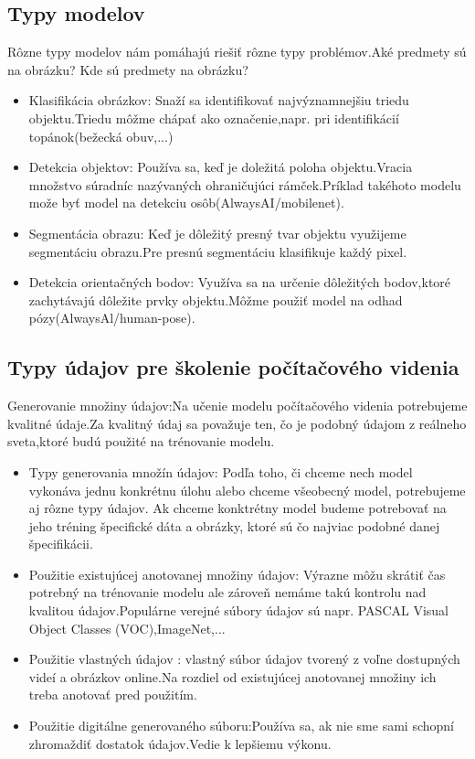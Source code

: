 \documentclass[10pt,twoside,slovak,a4paper]{coursepaper}
\begin{document}
\subsection{Typy modelov} \label{ina:nejako}
Rôzne typy modelov nám pomáhajú riešiť rôzne typy problémov.Aké predmety sú na obrázku? Kde sú predmety na obrázku?
\begin{itemize}
\item Klasifikácia obrázkov: Snaží sa identifikovať najvýznamnejšiu triedu objektu.Triedu môžme chápať ako označenie,napr. pri identifikácií topánok(bežecká obuv,...)

\item Detekcia objektov: Používa sa, keď je doležitá poloha objektu.Vracia množstvo súradníc nazývaných ohraničujúci rámček.Príklad takéhoto modelu može byť model na detekciu osôb(AlwaysAI/mobilenet).

\item Segmentácia obrazu: Keď je dôležitý presný tvar objektu využijeme segmentáciu obrazu.Pre presnú segmentáciu klasifikuje každý pixel.

\item Detekcia orientačných bodov: Využíva sa na určenie dôležitých bodov,ktoré zachytávajú dôležite prvky objektu.Môžme použiť model na odhad pózy(AlwaysAl/human-pose).
\cite{CV-Framework}
\end{itemize}

\subsection{Typy údajov pre školenie počítačového videnia}
Generovanie množiny údajov:Na učenie modelu počítačového videnia potrebujeme kvalitné údaje.Za kvalitný údaj sa považuje ten, čo je podobný údajom z reálneho sveta,ktoré budú použité na trénovanie modelu.

\begin{itemize}
\item Typy generovania množín údajov: Podľa toho, či chceme nech model vykonáva jednu konkrétnu úlohu alebo chceme všeobecný model, potrebujeme aj rôzne typy údajov.
Ak chceme konktrétny model budeme potrebovať na jeho tréning špecifické dáta a obrázky, ktoré sú čo najviac podobné danej špecifikácii.
\item Použitie existujúcej anotovanej množiny údajov: Výrazne môžu skrátiť čas potrebný na trénovanie modelu ale zároveň nemáme takú kontrolu nad kvalitou údajov.Populárne verejné súbory údajov sú napr. PASCAL Visual Object Classes (VOC),ImageNet,...
\item Použitie vlastných údajov : vlastný súbor údajov tvorený z voľne dostupných videí a obrázkov online.Na rozdiel od existujúcej anotovanej množiny ich treba anotovať pred použitím.
\item Použitie digitálne generovaného súboru:Používa sa, ak nie sme sami schopní zhromaždiť dostatok údajov.Vedie k lepšiemu výkonu.
\cite{CV-Framework}
\end{itemize}
\end{document}
